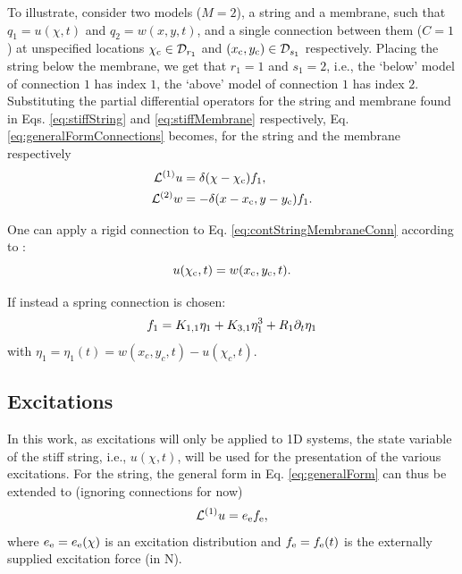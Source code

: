 \documentclass{article}
\begin{document}
  
To illustrate, consider two models ($M=2$), a string and a membrane, such that $q_1 = u(\chi ,t)$ and $q_2 = w(x,y,t)$, and a single connection between them ($C = 1$) at unspecified locations $\chi_{\text{c}} \in \mathcal{D}_{r_1}$ and $(x_{\text{c}}, y_{\text{c}}) \in \mathcal{D}_{s_1}$ respectively. Placing the string below the membrane, we get that $r_1 = 1$ and $s_1 = 2$, i.e., the `below' model of connection $1$ has index $1$, the `above' model of connection $1$ has index $2$. Substituting the partial differential operators for the string and membrane found in Eqs. \eqref{eq:stiffString} and \eqref{eq:stiffMembrane} respectively, Eq. \eqref{eq:generalFormConnections} becomes, for the string and the membrane respectively
\begin{subequations}
\begin{align}\label{eq:contStringMembraneConn}
        \mathcal{L}^{(1)} u &= \delta(\chi - \chi_{\text{c}})f_1,\\
        \mathcal{L}^{(2)} w &= -\delta(x - x_{\text{c}}, y-y_{\text{c}})f_1.
\end{align}
\end{subequations}

One can apply a rigid connection to Eq. \eqref{eq:contStringMembraneConn} according to \cite{theBible}: 
\begin{equation}
    u(\chi_{\text{c}}, t) = w(x_{\text{c}}, y_{\text{c}}, t).
\end{equation} 

If instead a spring connection is chosen:
\begin{equation}
    f_1 = K_{1, 1}\eta_1 + K_{3, 1}\eta_1^3 + R_1\partial_t \eta_1
\end{equation}
with $\eta_1 = \eta_1(t) = w(x_c, y_c, t) - u(\chi_c, t)$.

\subsection{Excitations}\label{sec:contExcitations}
In this work, as excitations will only be applied to 1D systems, the state variable of the stiff string, i.e., $u(\chi, t)$, will be used for the presentation of the various excitations. For the string, the general form in Eq. \eqref{eq:generalForm}
can thus be extended to (ignoring connections for now)
\begin{equation}\label{eq:generalFormString}
    \mathcal{L}^{(1)} u = e_{\text{e}} f_{\text{e}},
\end{equation}
where $e_{\text{e}} = e_{\text{e}}(\chi)$ is an excitation distribution and $f_{\text{e}} = f_{\text{e}}(t)$ is the externally supplied excitation force (in N).
\end{document}

